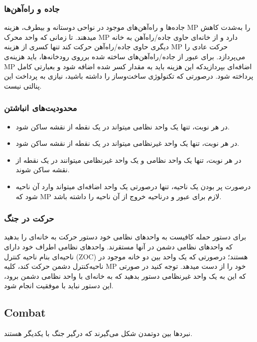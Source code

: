 \documentclass[]{article}
\begin{document}
\subsubsection*{{\titr جاده‌ و راه‌آهن‌ها}}
جاده‌ها و راه‌آهن‌های موجود در نواحی دوستانه و بیطرف، هزینه MP را به‌شدت کاهش میدهند. تا زمانی که واحد محرک MP دارد و از خانه‌ای حاوی جاده/راه‌آهن به خانه دیگری حاوی جاده/راه‌آهن حرکت کند تنها کسری از هزینه MP حرکت عادی را می‌پردازد.
برای عبور از جاده/راه‌آهن‌های ساخته شده برروی رودخانه‌ها، باید هزینه‌ی MP اضافه‌ای بپردازیدکه این هزینه باید به مقدار کسر شده اضافه شود و بعبارتی کامل پرداخته شود. درصورتی که تکنولوژی ساخت‌و‌ساز را داشته باشید، نیازی به پرداخت این پنالتی نیست.

\subsubsection*{{\titr محدودیت‌های انباشتن}}
\begin{itemize}
\item در هر نوبت، تنها یک واحد نظامی میتواند در یک نقطه از نقشه ساکن شود.
\item در هر نوبت، تنها یک واحد غیرنظامی میتواند در یک نقطه از نقشه ساکن شود.
\item در هر نوبت، تنها یک واحد نظامی و یک واحد غیرنظامی میتوانند در یک نقطه از نقشه ساکن شوند.
\item درصورت پر بودن یک ناحیه، تنها درصورتی یک واحد اضافه‌ای میتواند وارد آن ناحیه شود که MP لازم برای عبور و درناحیه خروج از آن ناحیه را داشته باشد.
\end{itemize}

\subsubsection*{{\titr حرکت در جنگ}}
برای دستور حمله کافیست به واحد‌های نظامی خود دستور حرکت به خانه‌ای را بدهید که واحد‌های نظامی دشمن در آنها مستقرند.
واحد‌های نظامی اطراف خود دارای ناحیه‌ای بنام ناحیه کنترل (ZOC) هستند؛ درصورتی که یک واحد بین دو خانه موجود در ناحیه‌کنترل دشمن حرکت کند، کلیه MP خود را از دست میدهد. توجه کنید در صورتی که این به یک واحد غیرنظامی دستور بدهید که به خانه‌ای با واحد نظامی دشمن برود، این دستور نباید با موفقیت انجام شود.

\subsection*{{\titr Combat}}
نبرد‌ها بین دوتمدن شکل می‌گیرند که درگیر جنگ با یکدیگر هستند. 
\end{document}
